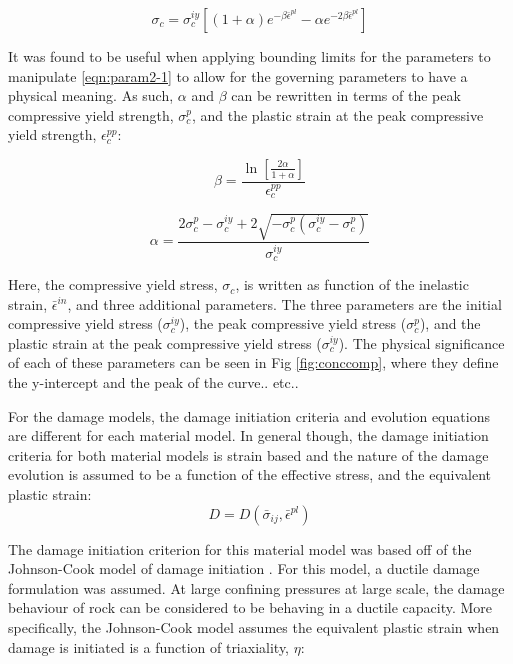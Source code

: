 \begin{equation}
\sigma_c=\sigma_c^{iy}\left [ \left ( 1+\alpha \right ) e^{-\beta\bar{\epsilon}^{pl}}-\alpha e^{-2\beta\bar{\epsilon}^{pl}}  \right ]
\label{eqn:param2-1}
\end{equation}

It was found to be useful when applying bounding limits for the parameters to manipulate \ref{eqn:param2-1} to allow for the governing parameters to have a physical meaning. As such, $\alpha$ and $\beta$ can be rewritten in terms of the peak compressive yield strength, $\sigma_{c}^{p}$, and the plastic strain at the peak compressive yield strength, $\epsilon_c^{pp}$:

\begin{equation}
\beta=\frac{\ln\left[\frac{2\alpha}{1+\alpha} \right ]}{\epsilon_c^{pp}}
\label{eqn:param2-2}
\end{equation}

\begin{equation}
\alpha =\frac{2\sigma_c^{p}-\sigma_c^{iy}+2\sqrt{-\sigma_c^p\left(\sigma_c^{iy}-\sigma_c^p \right )}}{\sigma_c^{iy}}
\label{eqn:param2-3}
\end{equation}

Here, the compressive yield stress, $\sigma_{c}$, is written as function
of the inelastic strain, $\bar{\epsilon}^{in}$, and three additional
parameters. The three parameters are the initial compressive yield
stress ($\sigma_{c}^{iy}$), the peak compressive yield stress ($\sigma_{c}^{p}$),
and the plastic strain at the peak compressive yield stress ($\sigma_{c}^{iy}$).
The physical significance of each of these parameters can be seen
in Fig \ref{fig:conccomp}, where they define the y-intercept and the peak of the curve..
etc..

For the damage models, the damage initiation criteria and evolution equations are different for each material model. In general though, the damage initiation criteria for both material models is strain based and the nature of the damage evolution is assumed to be a function of the effective stress, and the equivalent plastic strain:
\begin{equation}
D=D\left(\bar{\sigma}_{ij},\bar{\epsilon}^{pl}\right)\label{eqn:const8}
\end{equation}


The damage initiation criterion for this material model was based off of the Johnson-Cook model of damage initiation \cite{Johnson_1985}. For this model, a ductile damage formulation was assumed. At large confining pressures at large scale, the damage behaviour of rock can be considered to be behaving in a ductile capacity. More specifically, the Johnson-Cook model assumes the equivalent plastic strain when damage is initiated is a function of triaxiality, $\eta$:

